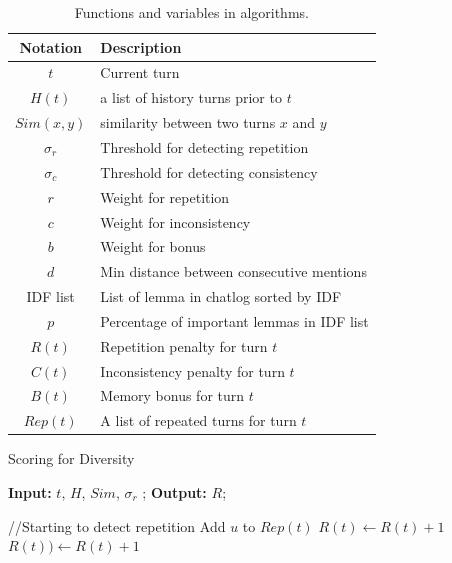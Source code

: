 \begin{table}[th]
\centering
\small
\begin{tabular}{c|l}
\toprule
\textbf{Notation} & \textbf{Description} \\ \midrule
$t$ & Current turn \\
$H(t)$  &  a list of history turns prior to $t$ \\
$Sim(x,y)$ & similarity between two turns $x$ and $y$ \\
$\sigma_r$ & Threshold for detecting repetition \\
$\sigma_c$ & Threshold for detecting consistency \\
$r$ & Weight for repetition \\
$c$ & Weight for inconsistency \\
$b$ & Weight for bonus \\
$d$ & Min distance between consecutive mentions \\
IDF list & List of lemma in chatlog sorted by IDF\\
$p$ & Percentage of important lemmas in IDF list\\
$R(t)$ &  Repetition penalty for turn $t$ \\
$C(t)$ &  Inconsistency penalty for turn $t$ \\ 
$B(t)$ &  Memory bonus for turn $t$ \\
$Rep(t)$ & A list of repeated turns for turn $t$ \\  
\bottomrule
\end{tabular}
\caption{
Functions and variables in algorithms.}
\label{tab:functions}
\end{table}

\begin{algorithm}[th]
\small
\caption{Scoring for Diversity}
\label{algo:rep}
\hspace*{0.02in} {\bf Input:}
 $t$, $H$, $Sim$, $\sigma_{r}$
; \hspace*{0.02in} {\bf Output: } 
 $R$;
\begin{algorithmic}[1]
\State //Starting to detect repetition
		\State Add $u$ to $Rep(t)$
	\EndIf
\EndFor
        \State $ R(t) \leftarrow  R(t) + 1$ 
        \Else
        \State $R(t)) \leftarrow R(t) + 1$ 
        \EndIf
        \EndIf
    \EndIf
\end{algorithmic}
\end{algorithm}



